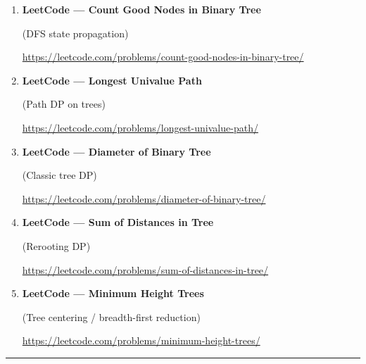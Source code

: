\documentclass[11pt]{article}
\begin{document}
\begin{enumerate}
(Tree DP with two states)

\vspace{0.3em}
{\url{https://leetcode.com/problems/house-robber-iii/}}

\vspace{0.8em}

\item \textbf{LeetCode --- Count Good Nodes in Binary Tree}

(DFS state propagation)

\vspace{0.3em}
{\url{https://leetcode.com/problems/count-good-nodes-in-binary-tree/}}

\vspace{0.8em}

\item \textbf{LeetCode --- Longest Univalue Path}

(Path DP on trees)

\vspace{0.3em}
{\url{https://leetcode.com/problems/longest-univalue-path/}}

\vspace{0.8em}

\item \textbf{LeetCode --- Diameter of Binary Tree}

(Classic tree DP)

\vspace{0.3em}
{\url{https://leetcode.com/problems/diameter-of-binary-tree/}}

\vspace{0.8em}

\item \textbf{LeetCode --- Sum of Distances in Tree}

(Rerooting DP)

\vspace{0.3em}
{\url{https://leetcode.com/problems/sum-of-distances-in-tree/}}

\vspace{0.8em}

\item \textbf{LeetCode --- Minimum Height Trees}

(Tree centering / breadth-first reduction)

\vspace{0.3em}
{\url{https://leetcode.com/problems/minimum-height-trees/}}

\end{enumerate}

\vspace{1em}
\hrule
\vspace{1em}
\end{document}
